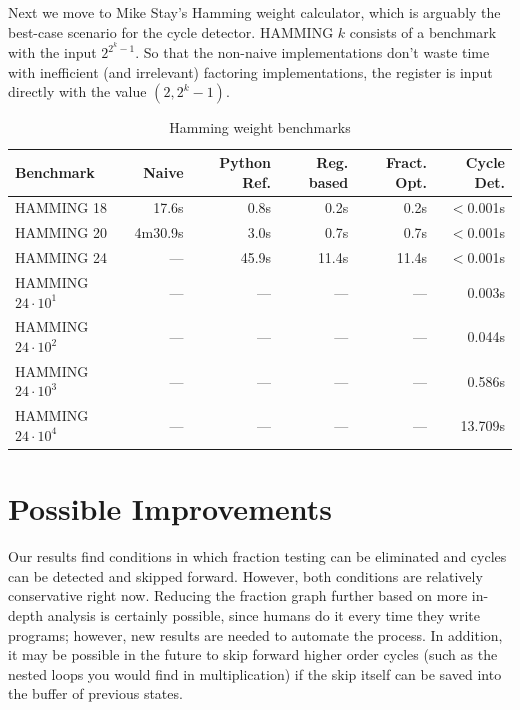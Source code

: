 \documentclass[12pt]{article}
\begin{document}
Next we move to Mike Stay's Hamming weight calculator, which is arguably the best-case scenario for the cycle detector. HAMMING $k$ consists of a benchmark with the input $2^{2^k - 1}$. So that the non-naive implementations don't waste time with inefficient (and irrelevant) factoring implementations, the register is input directly with the value $(2, 2^k - 1)$.

\begin{table}[h]
\centering
\begin{tabular}{lrrrrr}
\toprule
Benchmark & Naive & Python Ref. & Reg. based & Fract. Opt. & Cycle Det. \\
\midrule
HAMMING 18          & 17.6s    & 0.8s  & 0.2s  & 0.2s  & $<$0.001s \\
HAMMING 20          & 4m30.9s  & 3.0s  & 0.7s  & 0.7s  & $<$0.001s \\
HAMMING 24          & ---      & 45.9s & 11.4s & 11.4s & $<$0.001s \\
HAMMING $24\cdot10^1$ & ---    & ---   & ---   & ---   & 0.003s    \\
HAMMING $24\cdot10^2$ & ---    & ---   & ---   & ---   & 0.044s    \\
HAMMING $24\cdot10^3$ & ---    & ---   & ---   & ---   & 0.586s    \\
HAMMING $24\cdot10^4$ & ---    & ---   & ---   & ---   & 13.709s   \\
\bottomrule
\end{tabular}
\caption{Hamming weight benchmarks}
\end{table}

\section{Possible Improvements}

Our results find conditions in which fraction testing can be eliminated and cycles can be detected and skipped forward. However, both conditions are relatively conservative right now. Reducing the fraction graph further based on more in-depth analysis is certainly possible, since humans do it every time they write programs; however, new results are needed to automate the process. In addition, it may be possible in the future to skip forward higher order cycles (such as the nested loops you would find in multiplication) if the skip itself can be saved into the buffer of previous states.
\end{document}
